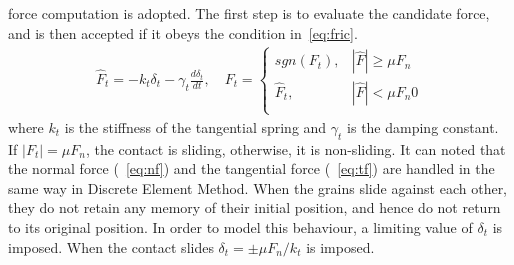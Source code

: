 force computation is 
adopted. The first step is to evaluate the candidate force, and is then 
accepted if it obeys the 
condition in~\cref{eq:fric}.
\begin{align}
 {\hat{F}_{t}}=-{{k}_{t}}{{\delta}_{t}}-{{\gamma}_{t}}\frac{d{{\delta}_{t}}}{dt},
  \quad F_{t}=
\begin{cases}
sgn(F_{t}), & {\left|\hat{F}\right|} \ge \mu F_{n} \\
{\hat{F}}_{t}, & {\left|\hat{F}\right|} < \mu F_{n} 0 \\
\end{cases}
\label{eq:tf}
\end{align} 
where $k_{t}$ is the stiffness of the tangential spring and $\gamma_{t}$ is the 
damping constant. 
If $|F_{t}|=\mu F_{n}$, the contact is sliding, otherwise, it is non-sliding. 
It can noted that 
the 
normal force (~\cref{eq:nf}) and the tangential force (~\cref{eq:tf}) are 
handled in the same 
way in Discrete Element Method. When the grains slide against each other, they 
do not retain any 
memory 
of their initial position, and hence do not return to its original position. In 
order to model 
this 
behaviour, a limiting value of $\delta_{t}$ is imposed. When the contact slides 
$\delta_{t}=\pm\mu 
F_{n}/k_{t}$ is imposed.

